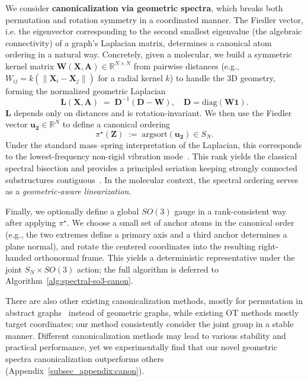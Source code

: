 \documentclass{article}
\theoremstyle{plain}
\theoremstyle{definition}
\theoremstyle{remark}
\newcommand{\R}{\mathbb{R}}
\newcommand{\1}{\mathbf{1}}
\newcommand{\Z}{\mathbf{Z}}
\newcommand{\A}{\mathbf{A}}
\newcommand{\W}{\mathbf{W}}
\newcommand{\D}{\mathbf{D}}
\newcommand{\Xc}{\mathbf{X}}
\begin{document}
We consider \textbf{canonicalization via geometric spectra}, which breaks both permutation and rotation symmetry in a coordinated manner. 
The Fiedler vector, i.e. the eigenvector corresponding to the second smallest eigenvalue (the algebraic connectivity) of a graph’s Laplacian matrix, determines a canonical atom ordering in a natural way.
Concretely, given a molecular, we build a symmetric kernel matrix $\W(\Xc,\A)\in\R^{N\times N}$ from pairwise distances (e.g., $W_{ij}=k(\|\Xc_i-\Xc_j\|)$ for a radial kernel $k$) to handle the 3D geometry, forming the normalized geometric Laplacian 
\begin{equation}
\mathbf L(\Xc,\A)\;=\;\D^{-1}(\D-\W), \quad \D=\mathrm{diag}(\W\1).
\end{equation}
$\mathbf L$ depends only on distances and is rotation-invariant. 
We then use the Fiedler vector $\mathbf{u_2}\in\R^N$ to define a canonical ordering
\begin{equation}
\pi^\star(\Z)\;:=\;\mathrm{argsort}(\mathbf{u_2})\in S_N.
\end{equation}
Under the standard mass–spring interpretation of the Laplacian, this corresponds to the lowest-frequency non-rigid vibration mode~\cite{knyazev2018spectralpartitioningsignedgraphs}. This rank yields the classical spectral bisection and provides a principled seriation keeping strongly connected substructures contiguous~\cite{doi:10.1137/0611030}. In the molecular context, the spectral ordering serves as a \emph{geometric-aware linearization}. 

Finally, we optionally define a global $SO(3)$ gauge in a rank-consistent way after applying $\pi^\star$. We choose a small set of anchor atoms in the canonical order (e.g., the two extremes define a primary axis and a third anchor determines a plane normal), and rotate the centered coordinates into the resulting right-handed orthonormal frame. This yields a deterministic representative under the joint $S_N\times SO(3)$ action; the full algorithm is deferred to Algorithm~\ref{alg:spectral-so3-canon}.

There are also other existing canonicalization methods, mostly for permutation in abstract graphs~\citep{zhao2024pard,LaplacianCanonization,RethinkingGraphCanon} instead of geometric graphs, while existing OT methods mostly target coordinates; our method consistently consider the joint group in a stable manner. 
Different canonicalization methods may lead to various stability and practical performance, yet we experimentally find that our novel geometric spectra canonicalization outperforms others (Appendix~\ref{subsec_appendix:canon}).
\end{document}

